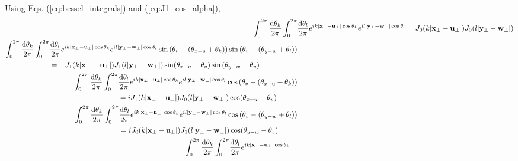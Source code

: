 Using Eqs. (\ref{eq:bessel_integrals}) and (\ref{eq:J1_cos_alpha}), 
\begin{subequations}
\begin{align}
\int_{0}^{2\pi} \frac{\diff \theta_k}{2 \pi} \int_{0}^{2\pi} & \frac{\diff \theta_l}{2 \pi} 
e^{i k |\mathbf{x}_\perp - \mathbf{u}_\perp| \cos{\theta_k}}
e^{i l |\mathbf{y}_\perp - \mathbf{w}_\perp| \cos{\theta_l}} = 
J_0(k |\mathbf{x}_\perp - \mathbf{u}_\perp|) J_0(l |\mathbf{y}_\perp - \mathbf{w}_\perp|) \\
\begin{split}
\int_{0}^{2\pi} \frac{\diff \theta_k}{2 \pi} \int_{0}^{2\pi} & \frac{\diff \theta_l}{2 \pi} 
e^{i k |\mathbf{x}_\perp - \mathbf{u}_\perp| \cos{\theta_k}}
e^{i l |\mathbf{y}_\perp - \mathbf{w}_\perp| \cos{\theta_l}} \sin \left(\theta_v - (\theta_{x-u} + \theta_k) \right) \sin \left(\theta_v - (\theta_{y-w} + \theta_l) \right)
\\ & = 
- J_1(k |\mathbf{x}_\perp - \mathbf{u}_\perp|) J_1(l |\mathbf{y}_\perp - \mathbf{w}_\perp|) \sin(\theta_{x-u} - \theta_v) \sin \left( \theta_{y-w} - \theta_v \right)
\end{split}\\
\begin{split}
\int_{0}^{2\pi} \frac{\diff \theta_k}{2 \pi} \int_{0}^{2\pi} & \frac{\diff \theta_l}{2 \pi} 
e^{i k |\mathbf{x}_\perp - \mathbf{u}_\perp| \cos{\theta_k}}
e^{i l |\mathbf{y}_\perp - \mathbf{w}_\perp| \cos{\theta_l}}
\cos \left(\theta_v - (\theta_{x-u} + \theta_k) \right) 
\\ & =  
i J_1(k |\mathbf{x}_\perp - \mathbf{u}_\perp|) J_0(l |\mathbf{y}_\perp - \mathbf{w}_\perp|) \cos(\theta_{x-u} - \theta_v) 
\end{split}\\
\begin{split}
\int_{0}^{2\pi} \frac{\diff \theta_k}{2 \pi} \int_{0}^{2\pi} & \frac{\diff \theta_l}{2 \pi} 
e^{i k |\mathbf{x}_\perp - \mathbf{u}_\perp| \cos{\theta_k}}
e^{i l |\mathbf{y}_\perp - \mathbf{w}_\perp| \cos{\theta_l}}
\cos \left(\theta_v - (\theta_{y-w} + \theta_l) \right)
\\ & =
i J_0(k |\mathbf{x}_\perp - \mathbf{u}_\perp|) J_1(l |\mathbf{y}_\perp - \mathbf{w}_\perp|) \cos(\theta_{y-w} - \theta_v) 
\end{split} \\
\begin{split}
\int_{0}^{2\pi} \frac{\diff \theta_k}{2 \pi} \int_{0}^{2\pi} & \frac{\diff \theta_l}{2 \pi} 
e^{i k |\mathbf{x}_\perp - \mathbf{u}_\perp| \cos{\theta_k}}

\end{split}
\end{align}
\end{subequations}
